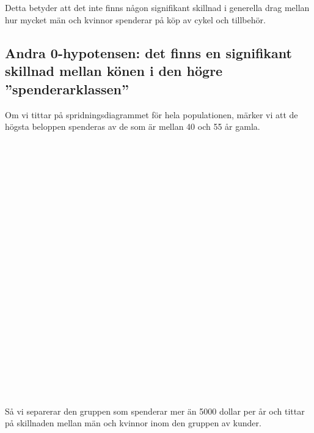\documentclass[]{article}
\begin{document}
\\\\\\\\
Detta betyder att det inte finns någon signifikant skillnad i generella drag mellan hur mycket män och kvinnor spenderar på köp av cykel och tillbehör.

\subsection{Andra 0-hypotensen: det finns en signifikant skillnad mellan könen i den högre ''spenderarklassen''}

Om vi tittar på spridningsdiagrammet för hela populationen, märker vi att de högsta beloppen spenderas av de som är mellan 40 och 55 år gamla.
\\\\\\\\\\\\\\\\\\\\\\\\\\\\\\\\\\\\\\\\\\\\
Så vi separerar den gruppen som spenderar mer än 5000 dollar per år och tittar på skillnaden mellan män och kvinnor inom den gruppen av kunder.
\end{document}
